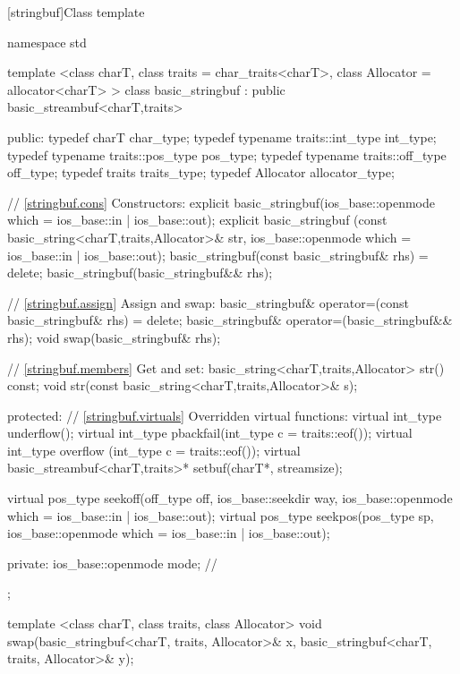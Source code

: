 [stringbuf]{Class template }
%
\begin{codeblock}
namespace std {
  template <class charT, class traits = char_traits<charT>,
      class Allocator = allocator<charT> >
  class basic_stringbuf : public basic_streambuf<charT,traits> {
  public:
    typedef charT                     char_type;
    typedef typename traits::int_type int_type;
    typedef typename traits::pos_type pos_type;
    typedef typename traits::off_type off_type;
    typedef traits                    traits_type;
    typedef Allocator                 allocator_type;

    // \ref{stringbuf.cons} Constructors:
    explicit basic_stringbuf(ios_base::openmode which
                               = ios_base::in | ios_base::out);
    explicit basic_stringbuf
    (const basic_string<charT,traits,Allocator>& str,
     ios_base::openmode which = ios_base::in | ios_base::out);
    basic_stringbuf(const basic_stringbuf& rhs) = delete;
    basic_stringbuf(basic_stringbuf&& rhs);

    // \ref{stringbuf.assign} Assign and swap:
    basic_stringbuf& operator=(const basic_stringbuf& rhs) = delete;
    basic_stringbuf& operator=(basic_stringbuf&& rhs);
    void swap(basic_stringbuf& rhs);

    // \ref{stringbuf.members} Get and set:
    basic_string<charT,traits,Allocator> str() const;
    void str(const basic_string<charT,traits,Allocator>& s);

  protected:
    // \ref{stringbuf.virtuals} Overridden virtual functions:
    virtual int_type   underflow();
    virtual int_type   pbackfail(int_type c = traits::eof());
    virtual int_type   overflow (int_type c = traits::eof());
    virtual  basic_streambuf<charT,traits>* setbuf(charT*, streamsize);


    virtual pos_type seekoff(off_type off, ios_base::seekdir way,
                             ios_base::openmode which
                               = ios_base::in | ios_base::out);
    virtual pos_type seekpos(pos_type sp,
                             ios_base::openmode which
                               = ios_base::in | ios_base::out);

  private:
    ios_base::openmode mode;  // \exposr
  };

  template <class charT, class traits, class Allocator>
  void swap(basic_stringbuf<charT, traits, Allocator>& x,
            basic_stringbuf<charT, traits, Allocator>& y);
}
\end{codeblock}

